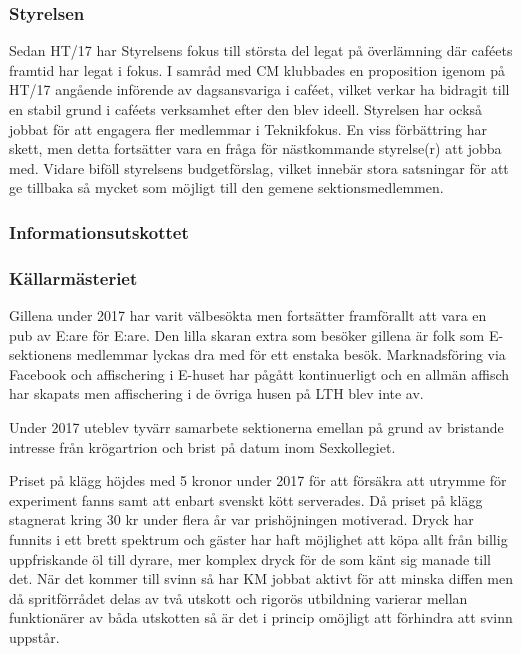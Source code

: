 \documentclass[../_main/handlingar.tex]{subfiles}
\begin{document}

\subsubsection*{Styrelsen}
Sedan HT/17 har Styrelsens fokus till största del legat på överlämning där caféets framtid har legat i fokus. I samråd med CM klubbades en proposition igenom på HT/17 angående införende av dagsansvariga i caféet, vilket verkar ha bidragit till en stabil grund i caféets verksamhet efter den blev ideell. Styrelsen har också jobbat för att engagera fler medlemmar i Teknikfokus. En viss förbättring har skett, men detta fortsätter vara en fråga för nästkommande styrelse(r) att jobba med. Vidare biföll styrelsens budgetförslag, vilket innebär stora satsningar för att ge tillbaka så mycket som möjligt till den gemene sektionsmedlemmen.

\subsubsection*{Informationsutskottet}

\subsubsection*{Källarmästeriet}
Gillena under 2017 har varit välbesökta men fortsätter framförallt att vara en pub av E:are för E:are. Den lilla skaran extra som besöker gillena är folk som E-sektionens medlemmar lyckas dra med för ett enstaka besök. Marknadsföring via Facebook och affischering i E-huset har pågått kontinuerligt och en allmän affisch har skapats men affischering i de övriga husen på LTH blev inte av.

Under 2017 uteblev tyvärr samarbete sektionerna emellan på grund av bristande intresse från krögartrion och brist på datum inom Sexkollegiet.

Priset på klägg höjdes med 5 kronor under 2017 för att försäkra att utrymme för experiment fanns samt att enbart svenskt kött serverades. Då priset på klägg stagnerat kring 30 kr under flera år var prishöjningen motiverad. Dryck har funnits i ett brett spektrum och gäster har haft möjlighet att köpa allt från billig uppfriskande öl till dyrare, mer komplex dryck för de som känt sig manade till det. När det kommer till svinn så har KM jobbat aktivt för att minska diffen men då spritförrådet delas av två utskott och rigorös utbildning varierar mellan funktionärer av båda utskotten så är det i princip omöjligt att förhindra att svinn uppstår.
\end{document}
